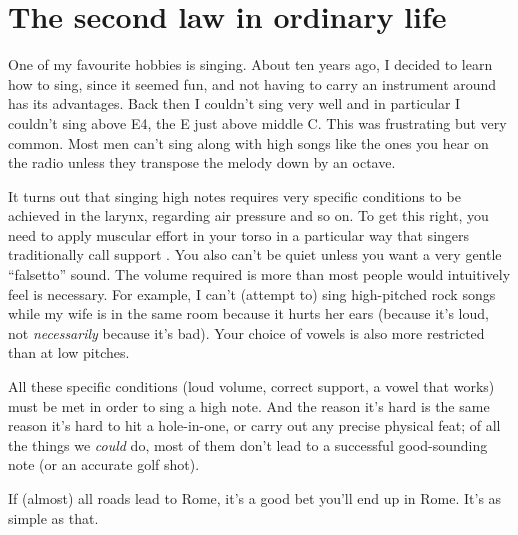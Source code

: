 \documentclass[a4paper, 12pt]{article}
\begin{document}
\section*{The second law in ordinary life}
One of my favourite hobbies is singing. About ten years ago, I decided to
learn how to sing, since it seemed fun, and not having to carry an instrument
around has its advantages. Back then I couldn't sing very well and in particular
I couldn't sing above E4, the E just above middle C. This was frustrating but
very common. Most men can't sing along with high songs like the ones you hear on
the radio unless they transpose the melody down by an octave.

It turns out that singing high notes requires very specific conditions to be
achieved in the larynx, regarding air pressure and so on. To get this right,
you need to apply muscular effort in your torso in a particular way that singers
traditionally call support \citep{cvt}. You also can't be quiet unless you want
a very gentle ``falsetto'' sound. The volume required is more than most people
would intuitively feel is necessary. For example, I can't (attempt to)
sing high-pitched
rock songs while my wife is in the same room because it hurts her ears
(because it's loud, not {\em necessarily} because it's bad). Your choice of vowels is also more restricted than at low pitches.

All these specific conditions (loud volume, correct support, a vowel that works)
must be met in order to sing a high note. And
the reason it's hard is the same reason it's hard to hit a hole-in-one, or
carry out any precise physical feat; of all the things we {\em could} do,
most of them don't lead to a successful good-sounding note (or an accurate
golf shot).

If (almost) all roads lead to Rome, it's a good bet you'll end up in Rome.
It's as simple as that.
\end{document}
